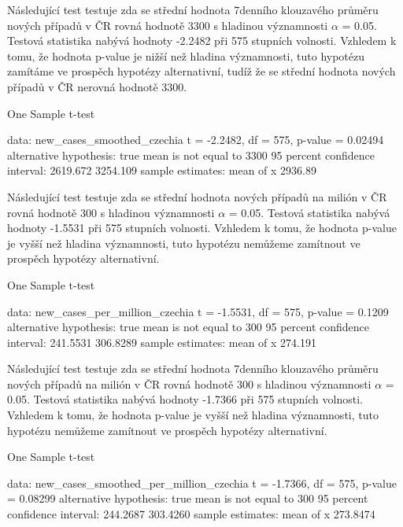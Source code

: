 \documentclass[a4paper, 12pt]{article}
\begin{document}
\clearpage

Následující test testuje zda se střední hodnota 7denního klouzavého průměru nových případů v ČR rovná
hodnotě 3300 s hladinou významnosti $\alpha$ = 0.05. Testová statistika nabývá hodnoty -2.2482 při 575 stupních volnosti. Vzhledem k tomu, že hodnota p-value je nižší než hladina významnosti, tuto hypotézu zamítáme ve prospěch hypotézy alternativní, tudíž že se střední hodnota
nových případů v ČR nerovná hodnotě 3300.
\begin{Schunk}
\begin{Soutput}
	One Sample t-test

data:  new_cases_smoothed_czechia
t = -2.2482, df = 575, p-value = 0.02494
alternative hypothesis: true mean is not equal to 3300
95 percent confidence interval:
 2619.672 3254.109
sample estimates:
mean of x 
  2936.89 
\end{Soutput}
\end{Schunk}

Následující test testuje zda se střední hodnota nových případů na milión v ČR rovná
hodnotě 300 s hladinou významnosti $\alpha$ = 0.05. Testová statistika nabývá hodnoty -1.5531 při 575 stupních volnosti. Vzhledem k tomu, že hodnota p-value je vyšší než hladina významnosti, tuto hypotézu nemůžeme zamítnout ve prospěch hypotézy alternativní.
\begin{Schunk}
\begin{Soutput}
	One Sample t-test

data:  new_cases_per_million_czechia
t = -1.5531, df = 575, p-value = 0.1209
alternative hypothesis: true mean is not equal to 300
95 percent confidence interval:
 241.5531 306.8289
sample estimates:
mean of x 
  274.191 
\end{Soutput}
\end{Schunk}

\clearpage

Následující test testuje zda se střední hodnota 7denního klouzavého průměru nových případů na milión v ČR rovná
hodnotě 300 s hladinou významnosti $\alpha$ = 0.05. Testová statistika nabývá hodnoty -1.7366 při 575 stupních volnosti. Vzhledem k tomu, že hodnota p-value je vyšší než hladina významnosti, tuto hypotézu nemůžeme zamítnout ve prospěch hypotézy alternativní.
\begin{Schunk}
\begin{Soutput}
	One Sample t-test

data:  new_cases_smoothed_per_million_czechia
t = -1.7366, df = 575, p-value = 0.08299
alternative hypothesis: true mean is not equal to 300
95 percent confidence interval:
 244.2687 303.4260
sample estimates:
mean of x 
 273.8474 
\end{Soutput}
\end{Schunk}
\end{document}
